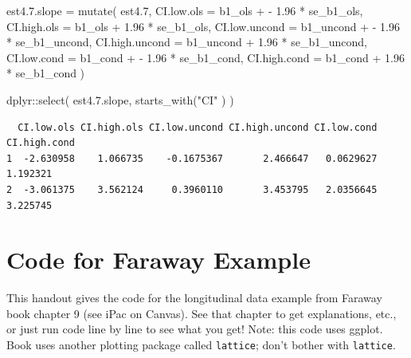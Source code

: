\documentclass[
  letterpaper,
  DIV=11,
  numbers=noendperiod]{scrreprt}
\newenvironment{Shaded}{}{}
\newcommand{\AttributeTok}[1]{\textcolor[rgb]{0.49,0.56,0.16}{#1}}
\newcommand{\FloatTok}[1]{\textcolor[rgb]{0.25,0.63,0.44}{#1}}
\newcommand{\FunctionTok}[1]{\textcolor[rgb]{0.02,0.16,0.49}{#1}}
\newcommand{\NormalTok}[1]{#1}
\newcommand{\OtherTok}[1]{\textcolor[rgb]{0.00,0.44,0.13}{#1}}
\newcommand{\SpecialCharTok}[1]{\textcolor[rgb]{0.25,0.44,0.63}{#1}}
\newcommand{\StringTok}[1]{\textcolor[rgb]{0.25,0.44,0.63}{#1}}
\begin{document}
\begin{Shaded}
\begin{Highlighting}[]
\NormalTok{est4.}\FloatTok{7.}\NormalTok{slope }\OtherTok{=} \FunctionTok{mutate}\NormalTok{( est4}\FloatTok{.7}\NormalTok{, }
                     \AttributeTok{CI.low.ols =}\NormalTok{ b1\_ols }\SpecialCharTok{+} \SpecialCharTok{{-}} \FloatTok{1.96} \SpecialCharTok{*}\NormalTok{ se\_b1\_ols,}
                     \AttributeTok{CI.high.ols =}\NormalTok{ b1\_ols }\SpecialCharTok{+} \FloatTok{1.96} \SpecialCharTok{*}\NormalTok{ se\_b1\_ols,}
                     \AttributeTok{CI.low.uncond =}\NormalTok{ b1\_uncond }\SpecialCharTok{+} \SpecialCharTok{{-}} \FloatTok{1.96} \SpecialCharTok{*}\NormalTok{ se\_b1\_uncond,}
                     \AttributeTok{CI.high.uncond =}\NormalTok{ b1\_uncond }\SpecialCharTok{+} \FloatTok{1.96} \SpecialCharTok{*}\NormalTok{ se\_b1\_uncond,}
                     \AttributeTok{CI.low.cond =}\NormalTok{ b1\_cond }\SpecialCharTok{+} \SpecialCharTok{{-}} \FloatTok{1.96} \SpecialCharTok{*}\NormalTok{ se\_b1\_cond,}
                     \AttributeTok{CI.high.cond =}\NormalTok{ b1\_cond }\SpecialCharTok{+} \FloatTok{1.96} \SpecialCharTok{*}\NormalTok{ se\_b1\_cond )}

\NormalTok{dplyr}\SpecialCharTok{::}\FunctionTok{select}\NormalTok{( est4.}\FloatTok{7.}\NormalTok{slope, }\FunctionTok{starts\_with}\NormalTok{(}\StringTok{"CI"}\NormalTok{ ) )}
\end{Highlighting}
\end{Shaded}

\begin{verbatim}
  CI.low.ols CI.high.ols CI.low.uncond CI.high.uncond CI.low.cond CI.high.cond
1  -2.630958    1.066735    -0.1675367       2.466647   0.0629627     1.192321
2  -3.061375    3.562124     0.3960110       3.453795   2.0356645     3.225745
\end{verbatim}

\chapter{Code for Faraway Example}\label{code-for-faraway-example}

This handout gives the code for the longitudinal data example from
Faraway book chapter 9 (see iPac on Canvas). See that chapter to get
explanations, etc., or just run code line by line to see what you get!
Note: this code uses ggplot. Book uses another plotting package called
\texttt{lattice}; don't bother with \texttt{lattice}.
\end{document}
